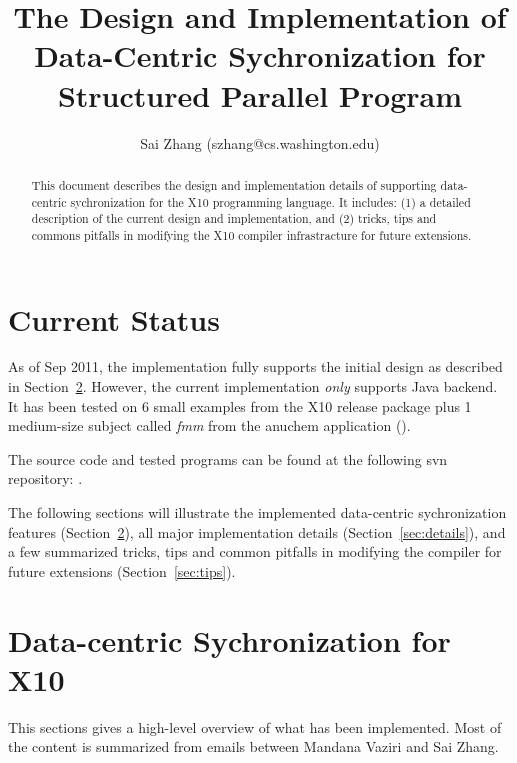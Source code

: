 \documentclass{article}
\begin{document}
\title{The Design and Implementation of Data-Centric Sychronization for Structured Parallel Program}
\author{Sai Zhang (szhang@cs.washington.edu)}

\maketitle

\begin{abstract}
This document describes the design and implementation details of supporting data-centric sychronization for the X10 programming language. It includes: (1) a detailed description of the current design and implementation, and (2) tricks, tips and commons pitfalls in modifying the X10 compiler infrastracture for future extensions.
\end{abstract}

\section{Current Status}

As of Sep 2011, the implementation fully supports the initial design as described in Section~\ref{sec:design}. However, the current implementation 
 \textit{only} supports Java backend. It has been tested on 6 small examples from the X10 release package plus 1 medium-size subject called \textit{fmm} from the anuchem application ().

The source code and tested programs can be found at the following svn repository: .  


The following sections will illustrate the implemented data-centric sychronization features (Section~\ref{sec:design}),  all major implementation details (Section~\ref{sec:details}), and a few summarized tricks, tips and common pitfalls in modifying the compiler for future extensions (Section~\ref{sec:tips}).

\section{Data-centric Sychronization for X10}
\label{sec:design}

This sections gives a high-level overview of what has been implemented. Most of the content is summarized from emails between Mandana Vaziri and Sai Zhang.
\end{document}
